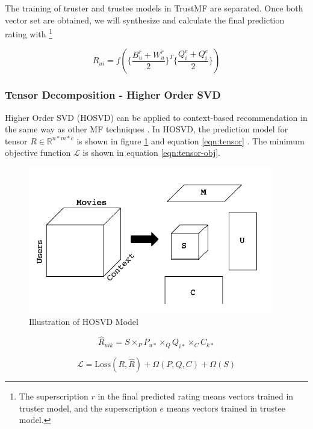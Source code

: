 \documentclass[letter paper, 11pt]{article}
\begin{document}
	The training of truster and trustee models in TrustMF are separated. Once both vector set are obtained, we will synthesize and calculate the final prediction rating with \footnote{The superscription $r$ in the final predicted rating means vectors trained in truster model, and the superscription $e$ means vectors trained in trustee model. }

	\begin{equation}
		\tag*{final predicted rating by TrustMF}
		R_{ui} = f(\{\dfrac{B_u^r + W_u^r}{2}\}^T \{\dfrac{Q_i^e + Q_i^e}{2}\})
	\end{equation}

			
			
	\subsubsection{Tensor Decomposition - Higher Order SVD}
	Higher Order SVD (HOSVD) can be applied to context-based recommendation in the same way as other MF techniques \cite{tensor}. In HOSVD, the prediction model for tensor $R \in \mathbb{R}^{n * m * c}$ is shown in figure \ref{fig:tensor} and equation \ref{eqn:tensor} \cite{latentFactor-RS}. The minimum objective function $\mathcal{L}$ is shown in equation \ref{eqn:tensor-obj}.
	
	\begin{figure}\label{fig:tensor}
		\centering
		\caption{Illustration of HOSVD Model \cite{tensor}}
		\includegraphics{tensor.png}
	\end{figure}
	
	\begin{equation}
		\label{eqn:tensor}
		\hat{R}_{uik} = S \times_P P_{u*} \times_Q Q_{i*} \times_C C_{k*}
	\end{equation}
	
	\begin{equation}
		\label{eqn:tensor-obj}
		\mathcal{L} = \text{Loss}(R, \hat{R}) +  \Omega(P, Q, C) + \Omega(S)
	\end{equation}
	
\end{document}
